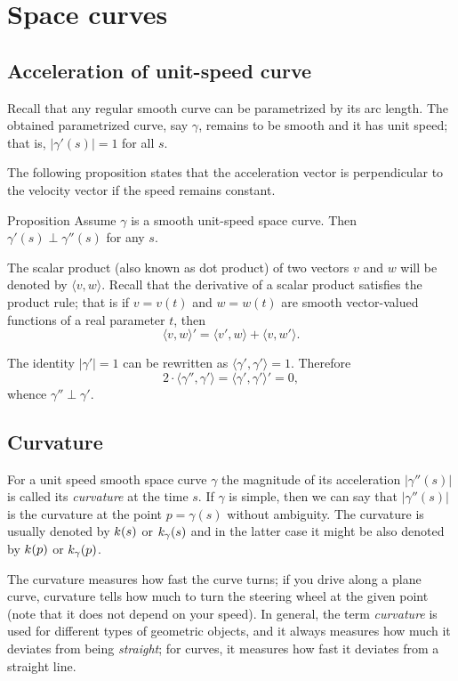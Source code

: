 \chapter{Space curves}

\section*{Acceleration of unit-speed curve}

Recall that any regular smooth curve can be parametrized by its arc length.
The obtained parametrized curve, say $\gamma$, remains to be smooth and it has unit speed; 
that is, $|\gamma'(s)|=1$ for all $s$.

The following proposition states that the acceleration vector is perpendicular to the velocity vector if the speed remains constant.

\begin{thm}{Proposition}\label{prop:a'-pertp-a''}
Assume $\gamma$ is a smooth unit-speed space curve.
Then $\gamma'(s)\perp \gamma''(s)$ for any $s$.
\end{thm}

The scalar product (also known as dot product) of two vectors $v$ and $w$ will be denoted by $\langle v,w\rangle$.
Recall that the derivative of a scalar product satisfies the product rule;
that is if $v=v(t)$ and $w=w(t)$ are smooth vector-valued functions of a real parameter $t$, then
\[\langle v,w\rangle'=\langle v',w\rangle+\langle v,w'\rangle.\]

The identity $|\gamma'|=1$ can be rewritten as $\langle\gamma',\gamma'\rangle=1$.
Therefore
\[2\cdot\langle\gamma'',\gamma'\rangle=\langle\gamma',\gamma'\rangle'=0,\]
whence $\gamma''\perp\gamma'$.
\qeds

\section*{Curvature}

For a unit speed smooth space curve $\gamma$ the magnitude of its acceleration $|\gamma''(s)|$ is called its \emph{curvature} at the time $s$.
\label{page:curvature}
If $\gamma$ is simple, then we can say that $|\gamma''(s)|$ is the curvature at the point $p=\gamma(s)$ without ambiguity.
The curvature is usually denoted by $k(s)$ or $k_\gamma(s)$ %
and in the latter case it might be also denoted by $k(p)$ or $k_\gamma(p)$. %

The curvature measures how fast the curve turns;
if you drive along a plane curve, curvature tells how much to turn the steering wheel at the given point (note that it does not depend on your speed).
In general, the term \emph{curvature} is used for different types of geometric objects, and it always measures how much it deviates from being \emph{straight};
for curves, it measures how fast it deviates from a straight line.

